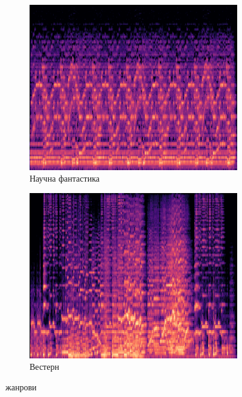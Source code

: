 \documentclass{article}
\begin{document}
\begin{figure}[htbp]
  \centering
  \begin{subfigure}{0.45\textwidth}
    \centering
    \includegraphics[width=\linewidth]{slike/scifi48.png} %
    \caption{Научна фантастика}
    \label{fig:slika9}
  \end{subfigure}
  \hfill
  \begin{subfigure}{0.45\textwidth}
    \centering
    \includegraphics[width=\linewidth]{slike/western06.png} %
    \caption{Вестерн}
    \label{fig:slika10}
  \end{subfigure}
  \caption{жанрови}
  \label{fig:zajednicki_naslov6}
\end{figure}
\end{document}
